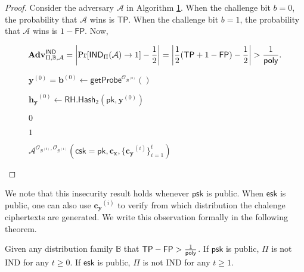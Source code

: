 \begin{proof}

Consider the adversary $\mathcal{A}$ in Algorithm \ref{alg:rh:ind}. When the challenge bit $b = 0$, the probability that $\mathcal{A}$ wins is $\textsf{TP}$. When the challenge bit $b = 1$, the probability that $\mathcal{A}$ wins is $1 - \textsf{FP}$. Now, 

\[
	\mathbf{Adv}_{\Pi, \mathbb{B}, \mathcal{A}}^{\textsf{IND}} = \left| \Pr[ \textsf{IND}_\Pi(\mathcal{A}) \to 1 ] - \frac{1}{2} \right| = \left| \frac{1}{2} (\textsf{TP} + 1 - \textsf{FP}) - \frac{1}{2} \right| > \frac{1}{\mathsf{poly}}.
\]

\begin{figure}[h]
\centering

	\begin{minipage}[t]{0.65\textwidth}
	\begin{algorithm}[H]
	\caption{$\mathcal{A}^{\mathcal{O}_{\mathcal{B}^{(0)}}, \mathcal{O}_{\mathcal{B}^{(1)}}} ( \textsf{csk} = \textsf{pk}, \mathbf{c_x}, \{ \mathbf{c_y}^{(i)} \}_{i=1}^t )$}
	\label{alg:rh:ind}
	\begin{algorithmic}[1]

		\State $\mathbf{y}^{(0)} = \mathbf{b}^{(0)} \gets \textsf{getProbe}^{\mathcal{O}_{\mathcal{B}^{(0)}}}()$
		
		\State $\mathbf{h_y}^{(0)} \gets \textsf{RH.Hash}_2(\textsf{pk}, \mathbf{y}^{(0)})$
		
		
			\State \Return $0$
		
		\Else
			
			\State \Return $1$
		
		\EndIf
	\end{algorithmic}
	\end{algorithm}
	\end{minipage}

\end{figure}

\end{proof}

We note that this insecurity result holds whenever $\textsf{psk}$ is public. When $\textsf{esk}$ is public, one can also use $\mathbf{c_y}^{(i)}$ to verify from which distribution the chalenge ciphertexts are generated. We write this observation formally in the following theorem.

\begin{theorem}

Given any distribution family $\mathbb{B}$ that $\textsf{TP} - \textsf{FP} > \frac{1}{\mathsf{poly}}$. If $\textsf{psk}$ is public, $\Pi$ is not IND for any $t \geq 0$. If $\textsf{esk}$ is public, $\Pi$ is not IND for any $t \geq 1$.

\end{theorem}

